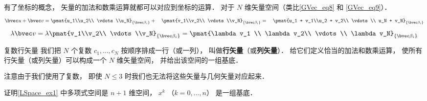 有了坐标的概念， 矢量的加法和数乘运算就都可以对应到坐标的运算． 对于 $N$ 维矢量空间（类比\autoref{GVec_eq8} 和 \autoref{GVec_eq9}）．
\begin{equation}
\bvec u + \bvec v = \pmat{u_1\\u_2\\ \vdots\\u_N}_{\{\bvec\beta_i\}} + \quad \pmat{v_1\\v_2\\ \vdots \\v_N}_{\{\bvec\beta_i\}} = \quad \pmat{u_1 + v_1\\u_2 + v_2\\ \vdots \\ u_N + v_N}_{\{\bvec\beta_i\}}
\end{equation}
\begin{equation}
\lambda \bvec v = \lambda\pmat{v_1\\v_2\\ \vdots \\v_N}_{\{\bvec\beta_i\}} = \pmat{\lambda v_1 \\ \lambda v_2\\ \vdots \\ \lambda v_N}_{\{\bvec\beta_i\}}
\end{equation}

\begin{exercise}{复数行矢量}
我们把 $N$ 个复数 $c_1, \dots, c_N$ 按顺序排成一行（或一列）， 叫做\textbf{行矢量}（或\textbf{列矢量}）． 给它们定义恰当的加法和数乘运算， 使所有行矢量（或列矢量）可以构成一个 $N$ 维矢量空间， 并给出该空间的一组基底．

注意由于我们使用了复数， 即使 $N \leqslant 3$ 时我们也无法将这些矢量与几何矢量对应起来．
\end{exercise}

\begin{exercise}{}
证明\autoref{LSpace_ex1} 中多项式空间是 $n+1$ 维空间， $x^k$ （$k = 0, \dots, n$） 是一组基底．
\end{exercise}
